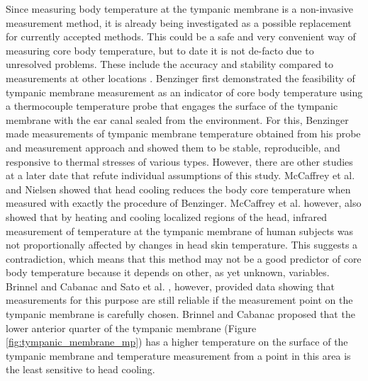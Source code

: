 Since measuring body temperature at the tympanic membrane is a non-invasive measurement method, it is already being investigated as a possible replacement for currently accepted methods.
This could be a safe and very convenient way of measuring core body temperature, but to date it is not de-facto due to unresolved problems.
These include the accuracy and stability compared to measurements at other locations \cite{maxtonEstimatingCoreTemperature2004, fulbrookCoreBodyTemperature1997, mumaComparisonRectalAxillary1991, rothAgreementRectalTympanic1996}.
Benzinger \cite{benzingerHeatRegulationHomeostasis1969, benzingerClinicalTemperatureNew1969, benzingerPhysicalHeatRegulation1959} first demonstrated the feasibility of tympanic membrane measurement as an indicator of core body temperature using a thermocouple temperature probe that engages the surface of the tympanic membrane with the ear canal sealed from the environment.
For this, Benzinger made measurements of tympanic membrane temperature obtained from his probe and measurement approach and showed them to be stable, reproducible, and responsive to thermal stresses of various types.
However, there are other studies at a later date that refute individual assumptions of this study.
McCaffrey et al. \cite{mccaffreyEffectHeadSkin1975} and Nielsen \cite{nielsenNaturalCoolingBrain1988} showed that head cooling reduces the body core temperature when measured with exactly the procedure of Benzinger.
McCaffrey et al. however, also showed that by heating and cooling localized regions of the head, infrared measurement of temperature at the tympanic membrane of human subjects was not proportionally affected by changes in head skin temperature.
This suggests a contradiction, which means that this method may not be a good predictor of core body temperature because it depends on other, as yet unknown, variables.
Brinnel and Cabanac \cite{brinnelTympanicTemperatureCore1989} and Sato et al. \cite{satoReexaminationTympanicMembrane1996}, however, provided data showing that measurements for this purpose are still reliable if the measurement point on the tympanic membrane is carefully chosen. 
Brinnel and Cabanac proposed that the lower anterior quarter of the tympanic membrane (Figure \ref{fig:tympanic_membrane_mp}) has a higher temperature on the surface of the tympanic membrane and temperature measurement from a point in this area is the least sensitive to head cooling.
